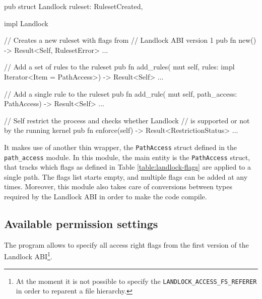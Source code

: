 \begin{code}[language=Rust, caption=The outline of the \texttt{landlock} module, label=lst:rust-landlock]
pub struct Landlock {
  ruleset: RulesetCreated,
}

impl Landlock {
  // Creates a new ruleset with flags from
  // Landlock ABI version 1
  pub fn new() -> Result<Self, RulesetError> {...}

  // Add a set of rules to the ruleset
  pub fn add_rules(
    mut self,
    rules: impl Iterator<Item = PathAccess>)
    -> Result<Self>
  {...}

  // Add a single rule to the ruleset
  pub fn add_rule(
    mut self,
    path_access: PathAccess) -> Result<Self>
  {...}

  // Self restrict the process and checks whether Landlock
  // is supported or not by the running kernel
  pub fn enforce(self) -> Result<RestrictionStatus> {...}
}
\end{code}

It makes use of another thin wrapper, the \texttt{PathAccess} struct defined in the \texttt{path\_access} module.
In this module, the main entity is the \texttt{PathAccess} struct, that tracks which flags as defined in Table \ref{table:landlock-flags}
are applied to a single path. The flags list starts empty, and multiple flags can be added at any times.
Moreover, this module also takes care of conversions between types required by the Landlock ABI in order
to make the code compile.

\subsection{Available permission settings}

The program allows to specify all access right flags from the first version of the Landlock
ABI\footnote{At the moment it is not possible to specify the \texttt{LANDLOCK\_ACCESS\_FS\_REFERER} in order to reparent a file hierarchy.}.


